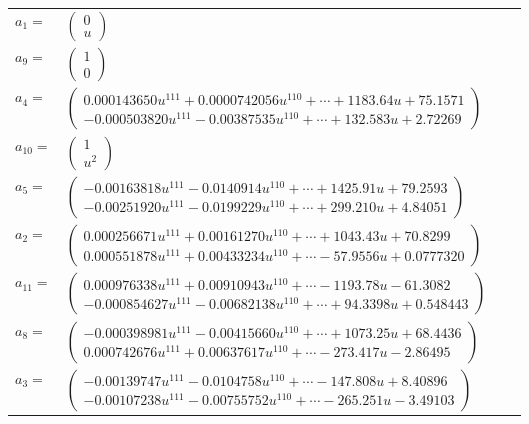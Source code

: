 \documentclass[1p]{elsarticle_modified}
\theoremstyle{definition}
\begin{document}
\begin{tabular}{m{7pt} m{180pt} m{7pt} m{180pt} }
\flushright $a_{1}=$&$\begin{pmatrix}0\\u\end{pmatrix}$ \\
\flushright $a_{9}=$&$\begin{pmatrix}1\\0\end{pmatrix}$ \\
\flushright $a_{4}=$&$\begin{pmatrix}0.000143650 u^{111}+0.0000742056 u^{110}+\cdots+1183.64 u+75.1571\\-0.000503820 u^{111}-0.00387535 u^{110}+\cdots+132.583 u+2.72269\end{pmatrix}$ \\
\flushright $a_{10}=$&$\begin{pmatrix}1\\u^2\end{pmatrix}$ \\
\flushright $a_{5}=$&$\begin{pmatrix}-0.00163818 u^{111}-0.0140914 u^{110}+\cdots+1425.91 u+79.2593\\-0.00251920 u^{111}-0.0199229 u^{110}+\cdots+299.210 u+4.84051\end{pmatrix}$ \\
\flushright $a_{2}=$&$\begin{pmatrix}0.000256671 u^{111}+0.00161270 u^{110}+\cdots+1043.43 u+70.8299\\0.000551878 u^{111}+0.00433234 u^{110}+\cdots-57.9556 u+0.0777320\end{pmatrix}$ \\
\flushright $a_{11}=$&$\begin{pmatrix}0.000976338 u^{111}+0.00910943 u^{110}+\cdots-1193.78 u-61.3082\\-0.000854627 u^{111}-0.00682138 u^{110}+\cdots+94.3398 u+0.548443\end{pmatrix}$ \\
\flushright $a_{8}=$&$\begin{pmatrix}-0.000398981 u^{111}-0.00415660 u^{110}+\cdots+1073.25 u+68.4436\\0.000742676 u^{111}+0.00637617 u^{110}+\cdots-273.417 u-2.86495\end{pmatrix}$ \\
\flushright $a_{3}=$&$\begin{pmatrix}-0.00139747 u^{111}-0.0104758 u^{110}+\cdots-147.808 u+8.40896\\-0.00107238 u^{111}-0.00755752 u^{110}+\cdots-265.251 u-3.49103\end{pmatrix}$ \\

\end{tabular}
\end{document}
